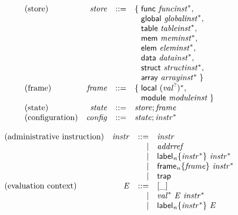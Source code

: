 $$
\begin{array}{@{}lrrl@{}l@{}}
\mbox{(store)} & {\mathit{store}} &::=& \{\; \begin{array}[t]{@{}l@{}l@{}}
\mathsf{func}~{{\mathit{funcinst}}^\ast},\; \\
  \mathsf{global}~{{\mathit{globalinst}}^\ast},\; \\
  \mathsf{table}~{{\mathit{tableinst}}^\ast},\; \\
  \mathsf{mem}~{{\mathit{meminst}}^\ast},\; \\
  \mathsf{elem}~{{\mathit{eleminst}}^\ast},\; \\
  \mathsf{data}~{{\mathit{datainst}}^\ast},\; \\
  \mathsf{struct}~{{\mathit{structinst}}^\ast},\; \\
  \mathsf{array}~{{\mathit{arrayinst}}^\ast} \;\}\end{array} \\
\mbox{(frame)} & {\mathit{frame}} &::=& \{\; \begin{array}[t]{@{}l@{}l@{}}
\mathsf{local}~{({{\mathit{val}}^?})^\ast},\; \\
  \mathsf{module}~{\mathit{moduleinst}} \;\}\end{array} \\
\mbox{(state)} & {\mathit{state}} &::=& {\mathit{store}} ; {\mathit{frame}} \\
\mbox{(configuration)} & {\mathit{config}} &::=& {\mathit{state}} ; {{\mathit{instr}}^\ast} \\
\end{array}
$$

\vspace{1ex}

$$
\begin{array}{@{}lrrl@{}l@{}}
\mbox{(administrative instruction)} & {\mathit{instr}} &::=& {\mathit{instr}} \\ &&|&
{\mathit{addrref}} \\ &&|&
{{\mathsf{label}}_{{\mathit{n}}}}{\{{{\mathit{instr}}^\ast}\}}~{{\mathit{instr}}^\ast} \\ &&|&
{{\mathsf{frame}}_{{\mathit{n}}}}{\{{\mathit{frame}}\}}~{{\mathit{instr}}^\ast} \\ &&|&
\mathsf{trap} \\
\mbox{(evaluation context)} & {\mathit{E}} &::=& {}[\mathsf{\_}] \\ &&|&
{{\mathit{val}}^\ast}~{\mathit{E}}~{{\mathit{instr}}^\ast} \\ &&|&
{{\mathsf{label}}_{{\mathit{n}}}}{\{{{\mathit{instr}}^\ast}\}}~{\mathit{E}} \\
\end{array}
$$

